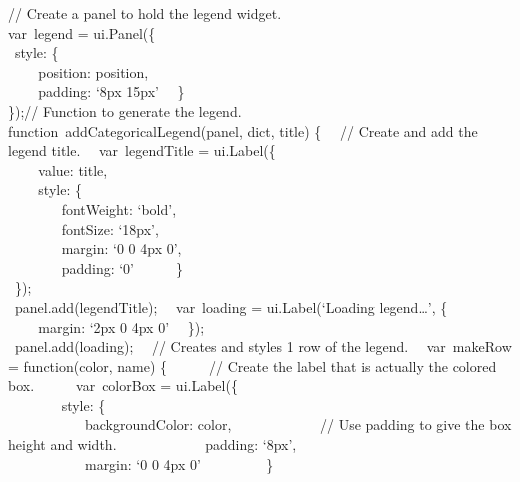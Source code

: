 \documentclass[
  letterpaper,
  DIV=11,
  numbers=noendperiod]{scrreprt}
\begin{document}
// Create a panel to hold the legend widget.\\
var~legend = ui.Panel(\{\\
\hspace*{0.333em} ~style: \{\\
\hspace*{0.333em} ~ ~ ~position: position,\\
\hspace*{0.333em} ~ ~ ~padding: `8px 15px'~ ~\}\\
\});// Function to generate the legend.\\
function~addCategoricalLegend(panel, dict, title) \{~ ~// Create and add
the legend title.~ ~var~legendTitle = ui.Label(\{\\
\hspace*{0.333em} ~ ~ ~value: title,\\
\hspace*{0.333em} ~ ~ ~style: \{\\
\hspace*{0.333em} ~ ~ ~ ~ ~fontWeight: `bold',\\
\hspace*{0.333em} ~ ~ ~ ~ ~fontSize: `18px',\\
\hspace*{0.333em} ~ ~ ~ ~ ~margin: `0 0 4px 0',\\
\hspace*{0.333em} ~ ~ ~ ~ ~padding: `0'~ ~ ~ ~\}\\
\hspace*{0.333em} ~\});\\
\hspace*{0.333em} ~panel.add(legendTitle);~ ~var~loading =
ui.Label(`Loading legend\ldots{}', \{\\
\hspace*{0.333em} ~ ~ ~margin: `2px 0 4px 0'~ ~\});\\
\hspace*{0.333em} ~panel.add(loading);~ ~// Creates and styles 1 row of
the legend.~ ~var~makeRow = function(color, name) \{~ ~ ~ ~// Create the
label that is actually the colored box.~ ~ ~ ~var~colorBox =
ui.Label(\{\\
\hspace*{0.333em} ~ ~ ~ ~ ~style: \{\\
\hspace*{0.333em} ~ ~ ~ ~ ~ ~ ~backgroundColor: color,~ ~ ~ ~ ~ ~ ~ ~//
Use padding to give the box height and width.~ ~ ~ ~ ~ ~ ~ ~padding:
`8px',\\
\hspace*{0.333em} ~ ~ ~ ~ ~ ~ ~margin: `0 0 4px 0'~ ~ ~ ~ ~ ~\}\\
\end{document}

